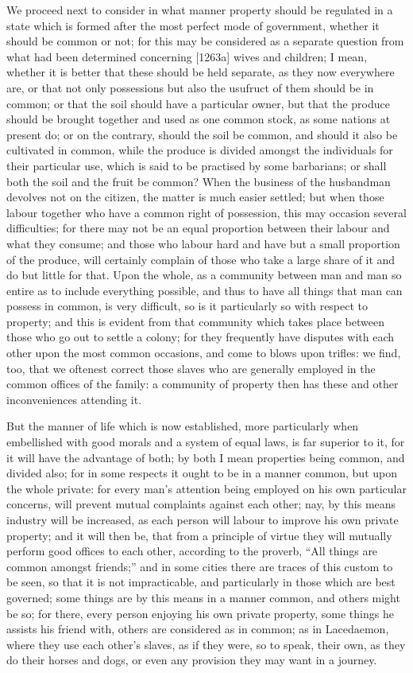We proceed next to consider in what manner property should be regulated in
a state which is formed after the most perfect mode of government, whether
it should be common or not; for this may be considered as a separate
question from what had been determined concerning [1263a] wives and
children; I mean, whether it is better that these should be held separate,
as they now everywhere are, or that not only possessions but also the
usufruct of them should be in common; or that the soil should have a
particular owner, but that the produce should be brought together and used
as one common stock, as some nations at present do; or on the contrary,
should the soil be common, and should it also be cultivated in common,
while the produce is divided amongst the individuals for their particular
use, which is said to be practised by some barbarians; or shall both the
soil and the fruit be common? When the business of the husbandman devolves
not on the citizen, the matter is much easier settled; but when those
labour together who have a common right of possession, this may occasion
several difficulties; for there may not be an equal proportion between
their labour and what they consume; and those who labour hard and have but
a small proportion of the produce, will certainly complain of those who
take a large share of it and do but little for that. Upon the whole, as a
community between man and man so entire as to include everything possible,
and thus to have all things that man can possess in common, is very
difficult, so is it particularly so with respect to property; and this is
evident from that community which takes place between those who go out to
settle a colony; for they frequently have disputes with each other upon
the most common occasions, and come to blows upon trifles: we find, too,
that we oftenest correct those slaves who are generally employed in the
common offices of the family: a community of property then has these and
other inconveniences attending it.

But the manner of life which is now established, more particularly when
embellished with good morals and a system of equal laws, is far superior
to it, for it will have the advantage of both; by both I mean properties
being common, and divided also; for in some respects it ought to be in a
manner common, but upon the whole private: for every man's attention being
employed on his own particular concerns, will prevent mutual complaints
against each other; nay, by this means industry will be increased, as each
person will labour to improve his own private property; and it will then
be, that from a principle of virtue they will mutually perform good
offices to each other, according to the proverb, ``All things are common
amongst friends;'' and in some cities there are traces of this custom to be
seen, so that it is not impracticable, and particularly in those which are
best governed; some things are by this means in a manner common, and
others might be so; for there, every person enjoying his own private
property, some things he assists his friend with, others are considered as
in common; as in Lacedaemon, where they use each other's slaves, as if
they were, so to speak, their own, as they do their horses and dogs, or
even any provision they may want in a journey.

